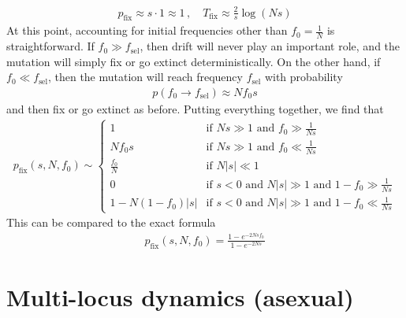 \documentclass[11pt]{article}
\begin{document}
\begin{align}
p_\mathrm{fix} \approx s \cdot 1 \approx 1 \, , \quad T_\mathrm{fix} \approx \frac{2}{s} \log(Ns) 
\end{align}
At this point, accounting for initial frequencies other than $f_0 = \frac{1}{N}$ is straightforward. If $f_0 \gg f_\mathrm{sel}$, then drift will never play an important role, and the mutation will simply fix or go extinct deterministically. On the other hand, if $f_0 \ll f_\mathrm{sel}$, then the mutation will reach frequency $f_\mathrm{sel}$ with probability
\begin{align}
p(f_0 \to f_\mathrm{sel}) \approx N f_0 s
\end{align}
and then fix or go extinct as before. Putting everything together, we find that
\begin{align}
p_\mathrm{fix}(s,N,f_0) \sim \begin{cases}
1 & \text{if $Ns \gg 1$ and $f_0 \gg \frac{1}{Ns}$} \\
N f_0 s & \text{if $Ns \gg 1$ and $f_0 \ll \frac{1}{Ns}$} \\
\frac{f_0}{N} & \text{if $N|s| \ll 1$} \\
0 & \text{if $s < 0$ and $N|s| \gg 1$ and $1-f_0 \gg \frac{1}{Ns}$} \\
1 - N(1-f_0) |s| & \text{if $s < 0$ and $N|s| \gg 1$ and $1-f_0 \ll \frac{1}{Ns}$}
\end{cases}
\end{align}
This can be compared to the exact formula
\begin{align}
p_\mathrm{fix}(s,N,f_0) = \frac{1-e^{-2Ns f_0}}{1-e^{-2Ns}}
\end{align}

\section{Multi-locus dynamics (asexual)}
\end{document}
